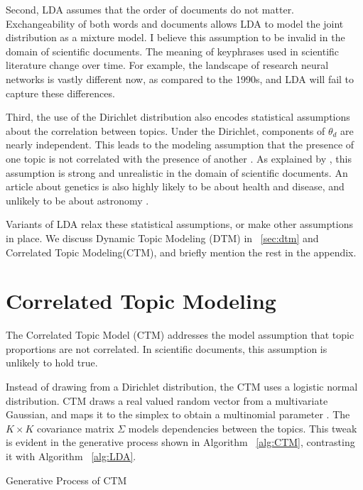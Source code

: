 \documentclass[letterpaper]{article}
\begin{document}
Second, LDA assumes that the order of documents do not matter.
Exchangeability of both words and documents allows LDA to model the
joint distribution as a mixture model. I believe this assumption to be
invalid in the domain of scientific documents. The meaning of
keyphrases used in scientific literature change over time. For
example, the landscape of research neural networks is vastly different
now, as compared to the 1990s, and LDA will fail to capture these
differences.

Third, the use of the Dirichlet distribution also encodes statistical
assumptions about the correlation between topics. Under the Dirichlet,
components of $\theta_d$ are nearly independent. This leads to the
modeling assumption that the presence of one topic is not correlated
with the presence of another \cite{blei2007correlated}. As explained
by \citeauthor{blei2007correlated}, this assumption is strong and
unrealistic in the domain of scientific documents. An article about
genetics is also highly likely to be about health and disease, and
unlikely to be about astronomy \cite{blei2007correlated}.

Variants of LDA relax these statistical assumptions, or make other
assumptions in place. We discuss Dynamic Topic Modeling (DTM) in
~\autoref{sec:dtm} and Correlated Topic Modeling(CTM), and briefly
mention the rest in the appendix.

\section{Correlated Topic Modeling}
\label{sec:ctm}
The Correlated Topic Model (CTM) addresses the model assumption that
topic proportions are not correlated. In scientific documents, this
assumption is unlikely to hold true.

Instead of drawing from a Dirichlet distribution, the CTM uses a
logistic normal distribution. CTM draws a real valued random vector
from a multivariate Gaussian, and maps it to the simplex to obtain a
multinomial parameter \cite{blei2007correlated}. The $K \times K$
covariance matrix $\Sigma$ models dependencies between the topics.
This tweak is evident in the generative process shown in Algorithm
~\autoref{alg:CTM}, contrasting it with Algorithm ~\autoref{alg:LDA}.

\begin{algorithm}
  \caption{Generative Process of CTM}\label{alg:CTM}
  \begin{algorithmic}[1]
    \EndFor
    \EndFor
  \end{algorithmic}
\end{algorithm}
\end{document}

